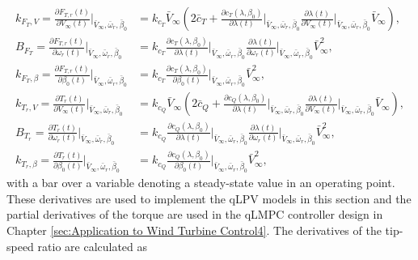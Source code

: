 \begin{align*}
    k_{F_T,V} = \frac{\partial F_{T,r}(t)}{\partial{V_{\infty}(t)}} \bigg|_{\bar{V}_{\infty},\bar{\omega}_r,\bar{\beta}_0} &= k_{c_T}  \bar{V}_{\infty} \left(2\bar{c}_T + \frac{\partial  c_T(\lambda,\beta_0)}{\partial{\lambda(t)}}\bigg|_{\bar{V}_{\infty},\bar{\omega}_r,\bar{\beta}_0}  \frac{ \partial \lambda(t)}{ \partial V_{\infty}(t)}\bigg|_{\bar{V}_{\infty},\bar{\omega}_r,\bar{\beta}_0} \bar{V}_{\infty} \right),\\
    B_{F_T} = \frac{\partial F_{T,r}(t)}{\partial{\omega_r(t) }}  \bigg|_{\bar{V}_{\infty},\bar{\omega}_r,\bar{\beta}_0} &= 
    k_{c_T} \frac{\partial c_{T}(\lambda,\beta_0)}{\partial \lambda(t)} \bigg|_{\bar{V}_{\infty},\bar{\omega}_r,\bar{\beta}_0} \frac{ \partial \lambda(t)}{ \partial \omega_r(t)}\bigg|_{\bar{V}_{\infty},\bar{\omega}_r,\bar{\beta}_0} \bar{V}_{\infty}^2, \\
    k_{F_T,\beta} = \frac{\partial F_{T,r}(t)}{\partial{\beta_0(t) }}  \bigg|_{\bar{V}_{\infty},\bar{\omega}_r,\bar{\beta}_0} &= 
    k_{c_T} \frac{\partial c_{T}(\lambda,\beta_0)}{\partial \beta_0(t)} \bigg|_{\bar{V}_{\infty},\bar{\omega}_r,\bar{\beta}_0} \bar{V}_{\infty}^2, \\
    k_{T_r,V} = \frac{\partial T_{r}(t)}{\partial{V_{\infty}(t)}} \bigg|_{\bar{V}_{\infty},\bar{\omega}_r,\bar{\beta}_0} &= k_{c_Q}  \bar{V}_{\infty} \left(2\bar{c}_Q + \frac{\partial  c_Q(\lambda,\beta_0)}{\partial{\lambda(t)}}\bigg|_{\bar{V}_{\infty},\bar{\omega}_r,\bar{\beta}_0}  \frac{ \partial \lambda(t)}{ \partial V_{\infty}(t)}\bigg|_{\bar{V}_{\infty},\bar{\omega}_r,\bar{\beta}_0} \bar{V}_{\infty} \right),\\
    B_{T_r} = \frac{\partial T_{r}(t)}{\partial{\omega_r(t) }}  \bigg|_{\bar{V}_{\infty},\bar{\omega}_r,\bar{\beta}_0} &= 
    k_{c_Q} \frac{\partial c_{Q}(\lambda,\beta_0)}{\partial \lambda(t)} \bigg|_{\bar{V}_{\infty},\bar{\omega}_r,\bar{\beta}_0} \frac{ \partial \lambda(t)}{ \partial \omega_r(t)}\bigg|_{\bar{V}_{\infty},\bar{\omega}_r,\bar{\beta}_0} \bar{V}_{\infty}^2, \\
    k_{T_r,\beta} = \frac{\partial T_{r}(t)}{\partial{\beta_0(t) }}  \bigg|_{\bar{V}_{\infty},\bar{\omega}_r,\bar{\beta}_0} &= 
    k_{c_Q} \frac{\partial c_{Q}(\lambda,\beta_0)}{\partial \beta_0(t)} \bigg|_{\bar{V}_{\infty},\bar{\omega}_r,\bar{\beta}_0} \bar{V}_{\infty}^2, 
\end{align*}
with a bar over a variable denoting a steady-state value in an operating point.
These derivatives are used to implement the qLPV models in this section and the partial derivatives of the torque are used in the qLMPC controller design in Chapter \ref{sec:Application to Wind Turbine Control4}. The derivatives of the tip-speed ratio are calculated as
